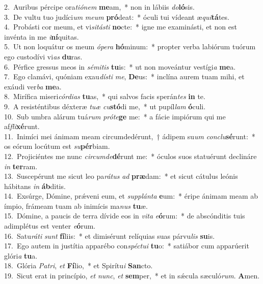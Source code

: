 {2.~}Auribus pércipe ora\textit{ti}\textit{ó}\textit{nem} \textbf{me}am,~* non in lábiis \textit{do}\textbf{ló}sis.\\
{3.~}De vultu tuo judíci\textit{um} \textit{me}\textit{um} \textbf{pró}deat:~* óculi tui vídeant æ\textit{qui}\textbf{tá}tes.\\
{4.~}Probásti cor meum, et vi\textit{si}\textit{tá}\textit{sti} \textbf{no}cte:~* igne me examinásti, et non est invénta in me \textit{i}\textbf{ní}quitas.\\
{5.~}Ut non loquátur os meum \textit{ó}\textit{pe}\textit{ra} \textbf{hó}minum:~* propter verba labiórum tuórum ego custodívi vi\textit{as} \textbf{du}ras.\\
{6.~}Pérfice gressus meos in \textit{sé}\textit{mi}\textit{tis} \textbf{tu}is:~* ut non moveántur vestígi\textit{a} \textbf{me}a.\\
{7.~}Ego clamávi, quóniam exau\textit{dí}\textit{sti} \textit{me}, \textbf{De}us:~* inclína aurem tuam mihi, et exáudi ver\textit{ba} \textbf{me}a.\\
{8.~}Mirífica miseri\textit{cór}\textit{di}\textit{as} \textbf{tu}as,~* qui salvos facis sperán\textit{tes} \textbf{in} te.\\
{9.~}A resisténtibus déxteræ \textit{tu}\textit{æ} \textit{cu}\textbf{stó}di me,~* ut pupíl\textit{lam} \textbf{ó}culi.\\
{10.~}Sub umbra alárum tuá\textit{rum} \textit{pró}\textit{te}\textbf{ge} me:~* a fácie impiórum qui me af\textit{fli}\textbf{xé}runt.\\
{11.~}Inimíci mei ánimam meam circumdedérunt,~† ádipem su\textit{um} \textit{con}\textit{clu}\textbf{sé}runt:~* os eórum locútum est \textit{su}\textbf{pér}biam.\\
{12.~}Projiciéntes me nunc \textit{cir}\textit{cum}\textit{de}\textbf{dé}runt me:~* óculos suos statuérunt declináre \textit{in} \textbf{ter}ram.\\
{13.~}Suscepérunt me sicut leo pa\textit{rá}\textit{tus} \textit{ad} \textbf{præ}dam:~* et sicut cátulus leónis hábitans \textit{in} \textbf{áb}ditis.\\
{14.~}Exsúrge, Dómine, prǽveni eum, et \textit{sup}\textit{plán}\textit{ta} \textbf{e}um:~* éripe ánimam meam ab ímpio, frámeam tuam ab inimícis ma\textit{nus} \textbf{tu}æ.\\
{15.~}Dómine, a paucis de terra dívide eos in \textit{vi}\textit{ta} \textit{e}\textbf{ó}rum:~* de abscónditis tuis adimplétus est venter \textit{e}\textbf{ó}rum.\\
{16.~}Satu\textit{rá}\textit{ti} \textit{sunt} \textbf{fí}liis:~* et dimisérunt relíquias suas párvu\textit{lis} \textbf{su}is.\\
{17.~}Ego autem in justítia apparébo con\textit{spé}\textit{ctu}\textit{i} \textbf{tu}o:~* satiábor cum apparúerit glóri\textit{a} \textbf{tu}a.\\
{18.~}Glória \textit{Pa}\textit{tri}, \textit{et} \textbf{Fí}lio,~* et Spirítu\textit{i} \textbf{San}cto.\\
{19.~}Sicut erat in princípio, \textit{et} \textit{nunc}, \textit{et} \textbf{sem}per,~* et in sǽcula sæculó\textit{rum}. \textbf{A}men.\\

